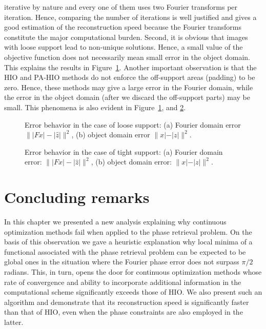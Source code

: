 iterative by nature and every one of them uses two Fourier transforms
per iteration. Hence, comparing the number of iterations is well
justified and gives a good estimation of the reconstruction speed
because the Fourier transforms constitute the major computational
burden. Second, it is obvious that images with loose support lead to
non-unique solutions. Hence, a small value of the objective function
does not necessarily mean small error in the object domain. This
explains the results in Figure~\ref{fig:rec-speed-losesup}. Another
important observation is that the HIO and PA-HIO methods do not
enforce the off-support areas (padding) to be zero. Hence, these
methods may give a large error in the Fourier domain, while the error
in the object domain (after we discard the off-support parts) may be
small. This phenomena is also evident in
Figure~\ref{fig:rec-speed-losesup}, and \ref{fig:rec-speed-tightsup}.

\begin{figure}[H]
  \centering
  \caption[Error behavior in the case of loose support]{Error behavior in the case of loose support:
    (a) Fourier domain error $\||Fx| - |\hat{z}|\|^{2}$,
    (b) object domain error $\|x| - |z|\|^{2}$.}
  \label{fig:rec-speed-losesup}
\end{figure}

\begin{figure}[H]
  \centering{}
  \caption[Error behavior in the case of tight support]{Error behavior in the case of tight support:
    (a) Fourier domain error: $\||Fx| - |\hat{z}|\|^{2}$,
    (b) object domain error: $\|x| - |z|\|^{2}$.}
  \label{fig:rec-speed-tightsup}
\end{figure}

\section{Concluding remarks}
\label{sec:approx-phase2-conclusions}
In this chapter we presented a new analysis explaining
why continuous optimization methods fail when applied to the phase
retrieval problem. On the basis of this observation we gave a
heuristic explanation why local minima of a functional associated with
the phase retrieval problem can be expected to be global ones in the
situation where the Fourier phase error does not surpass $\pi/2$
radians. This, in turn, opens the door for continuous optimization
methods whose rate of convergence and ability to incorporate
additional information in the computational scheme significantly
exceeds those of HIO. We also present such an algorithm and demonstrate
that its reconstruction speed is significantly faster than that of
HIO, even when the phase constraints are also employed in the latter.

